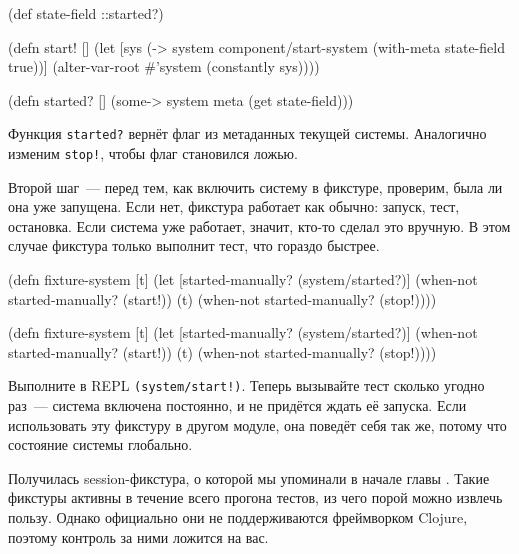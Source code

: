 \else

\begin{english}
  \begin{clojure}
(def state-field ::started?)

(defn start! []
  (let [sys (-> system
                component/start-system
                (with-meta {state-field true}))]
    (alter-var-root #'system (constantly sys))))

(defn started? []
  (some-> system meta (get state-field)))
  \end{clojure}
\end{english}

\fi

Функция \verb|started?| вернёт флаг из метаданных текущей системы. Аналогично
изменим \verb|stop!|, чтобы флаг становился ложью.

Второй шаг~--- перед тем, как включить систему в фикстуре, проверим, была ли она
уже запущена. Если нет, фикстура работает как обычно: запуск, тест,
остановка. Если система уже работает, значит, кто-то сделал это вручную. В этом
случае фикстура только выполнит тест, что гораздо быстрее.

\ifnarrow

\begin{english}
  \begin{clojure}
(defn fixture-system [t]
  (let [started-manually?
        (system/started?)]
    (when-not started-manually?
      (start!))
    (t)
    (when-not started-manually?
      (stop!))))
  \end{clojure}
\end{english}

\else

\begin{english}
  \begin{clojure}
(defn fixture-system [t]
  (let [started-manually? (system/started?)]
    (when-not started-manually?
      (start!))
    (t)
    (when-not started-manually?
      (stop!))))
  \end{clojure}
\end{english}

\fi

Выполните в REPL \verb|(system/start!)|. Теперь вызывайте тест сколько угодно
раз~--- система включена постоянно, и не придётся ждать её запуска. Если
использовать эту фикстуру в другом модуле, она поведёт себя так же, потому что
состояние системы глобально.

Получилась session-фикстура, о которой мы упоминали в начале
главы . Такие фикстуры активны в течение всего прогона тестов,
из чего порой можно извлечь пользу. Однако официально они не поддерживаются
фреймворком Clojure, поэтому контроль за ними ложится на вас.


